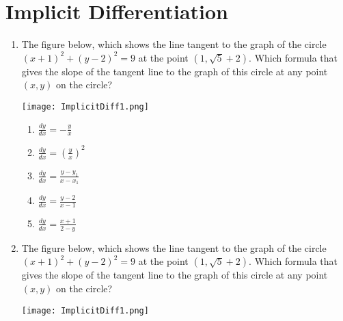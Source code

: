 \documentclass[12pt]{report}
\begin{document}
\newcommand{\less}{\textless}
\newcommand{\greater}{\textgreater}
\newcommand{\reals}{\mathbb{R}}
\newcommand{\integers}{\mathbb{Z}}
\newcommand{\rationals}{\mathbb{Q}}
\newcommand{\dsp}{\displaystyle}


\section*{Implicit Differentiation}

\begin{enumerate}

\item The figure below, which shows the line tangent to the graph of the circle $(x+1)^2 + (y-2)^2 = 9$ at the point $\left(1, \sqrt{5}+2\right)$. Which formula that gives the slope of the tangent line to the graph of this circle at any point $(x, y)$ on the circle?

\begin{center}
	\texttt{[image: ImplicitDiff1.png]}
\end{center}

\begin{enumerate}

\item $\frac{dy}{dx}=-\frac{y}{x}$

\item $\frac{dy}{dx}=\left(\frac{y}{x}\right)^2$

\item $\frac{dy}{dx}=\frac{y-y_1}{x-x_1}$

\item $\frac{dy}{dx}=\frac{y-2}{x-1}$

\item $\frac{dy}{dx}=\frac{x+1}{2-y}$

\end{enumerate}

\pagebreak

\item The figure below, which shows the line tangent to the graph of the circle $(x+1)^2 + (y-2)^2 = 9$ at the point $\left(1, \sqrt{5}+2\right)$. Which formula that gives the slope of the tangent line to the graph of this circle at any point $(x, y)$ on the circle?

\begin{center}
	\texttt{[image: ImplicitDiff1.png]}
\end{center}

\begin{enumerate}


\end{enumerate}
\end{enumerate}
\end{document}
